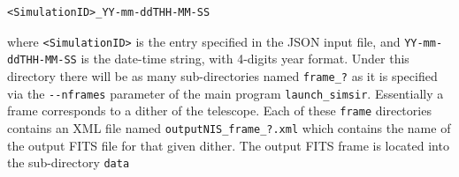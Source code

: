\begin{verbatim}
<SimulationID>_YY-mm-ddTHH-MM-SS
\end{verbatim}

where \verb+<SimulationID>+ is the entry specified in the JSON input file, and \verb+YY-mm-ddTHH-MM-SS+ is the date-time string, with 4-digits year format. Under this directory there will be as many sub-directories named \verb+frame_?+ as it is specified via the \verb+--nframes+ parameter of the main program \verb+launch_simsir+. Essentially a frame corresponds to a dither of the telescope. Each of these \verb+frame+ directories contains an XML file named \verb+outputNIS_frame_?.xml+ which contains the name of the output FITS file for that given dither. The output FITS frame is located into the sub-directory \verb+data+